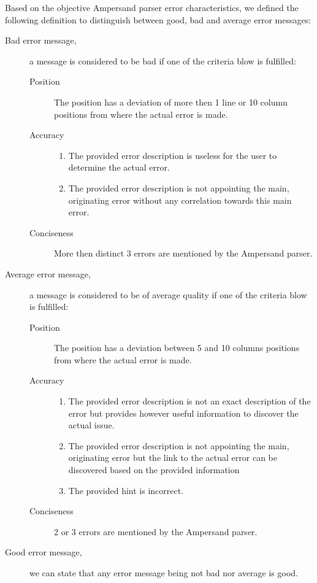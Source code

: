 Based on the objective Ampersand parser error characteristics, we defined the following definition to distinguish between good, bad and average error messages:

\begin{description}
	\item [Bad error message,]a message is considered to be bad if one of the criteria blow is fulfilled:
		\begin{description}
			\item [Position]
			The position has a deviation of more then 1 line or 10 column positions from where the actual error is made.
			\item [Accuracy]
				\begin{enumerate}
					\item 	The provided error description is useless for the user to determine the actual error.
					\item 	The provided error description is not appointing the main, originating error without any correlation towards this main error.
				\end {enumerate}
			\item[Conciseness]
			More then distinct 3 errors are mentioned by the Ampersand parser.
		\end {description}
	\item [Average error message,] a message is considered to be of average quality if one of the criteria blow is fulfilled:
		\begin{description}
			\item [Position]
			The position has a deviation between 5 and  10 columns positions from where the actual error is made.
			\item [Accuracy]
				\begin{enumerate}
					\item 	The provided error description is not an exact description of the error but provides however useful information to discover the actual issue.
					\item 	The provided error description is not appointing the main, originating error but the link to the actual error can be discovered based on the provided information
					\item 	The provided hint is incorrect.
				\end {enumerate}
			\item[Conciseness]
			2 or 3 errors are mentioned by the Ampersand parser.
		\end {description}
		
	\item [Good error message,] we can state that any error message being not bad nor average is good.
\end {description}

